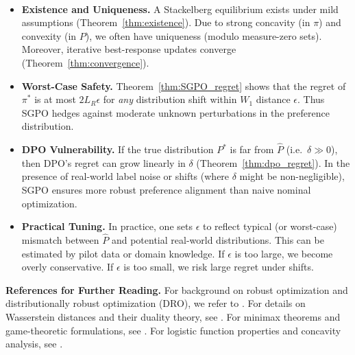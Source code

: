 \begin{remark}
\ 
\begin{itemize}
\item \textbf{Existence and Uniqueness.}  A Stackelberg equilibrium exists under mild assumptions (Theorem~\ref{thm:existence}).  Due to strong concavity (in $\pi$) and convexity (in $P$), we often have uniqueness (modulo measure-zero sets).  Moreover, iterative best-response updates converge (Theorem~\ref{thm:convergence}).

\item \textbf{Worst-Case Safety.}  Theorem~\ref{thm:SGPO_regret} shows that the regret of $\pi^*$ is at most $2L_R\epsilon$ for \emph{any} distribution shift within $W_1$ distance $\epsilon$.  Thus SGPO hedges against moderate unknown perturbations in the preference distribution.  

\item \textbf{DPO Vulnerability.}  If the true distribution $P^*$ is far from $\hat{P}$ (i.e.\ $\delta\gg 0$), then DPO’s regret can grow linearly in $\delta$ (Theorem~\ref{thm:dpo_regret}).  In the presence of real-world label noise or shifts (where $\delta$ might be non-negligible), SGPO ensures more robust preference alignment than naive nominal optimization.

\item \textbf{Practical Tuning.}  In practice, one sets $\epsilon$ to reflect typical (or worst-case) mismatch between $\hat{P}$ and potential real-world distributions.  This can be estimated by pilot data or domain knowledge.  If $\epsilon$ is too large, we become overly conservative.  If $\epsilon$ is too small, we risk large regret under shifts.
\end{itemize}
\end{remark}

\vspace{6pt}
\noindent
\textbf{References for Further Reading.} 
For background on robust optimization and distributionally robust optimization (DRO), we refer to \cite{ben2009robust, rahimian2019distributionally, gao2022distributionally}.  For details on Wasserstein distances and their duality theory, see \cite{villani2003topics, peyre2019computational}.  For minimax theorems and game-theoretic formulations, see \cite{sion1958general, basar1999dynamic}.  For logistic function properties and concavity analysis, see \cite{boyd2004convex}.




